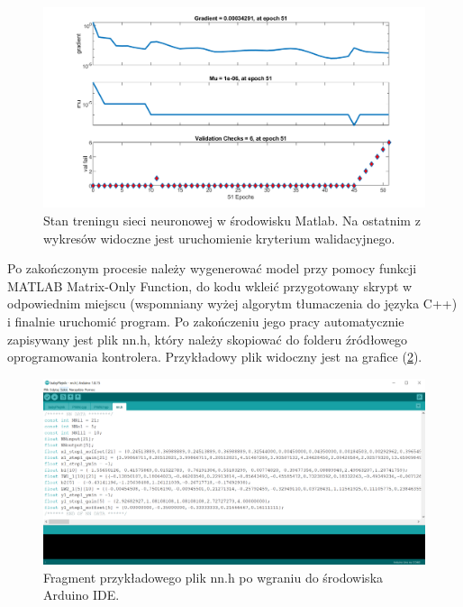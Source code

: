 \documentclass[12pt, a4paper]{article}
\let\oldref\ref
\renewcommand{\ref}[1]{(\oldref{#1})}
\begin{document}
 \begin{figure}[ht]
    \centering
    \includegraphics[width=1\textwidth]{training_state}
    \caption{Stan treningu sieci neuronowej w środowisku Matlab. Na ostatnim z wykresów widoczne jest uruchomienie kryterium walidacyjnego.}
    \label{fig:matwyk}
\end{figure}

Po zakończonym procesie należy wygenerować model przy pomocy funkcji MATLAB Matrix-Only Function, do kodu wkleić przygotowany skrypt w odpowiednim miejscu (wspomniany wyżej algorytm tłumaczenia do języka C++) i finalnie uruchomić program. Po zakończeniu jego pracy automatycznie zapisywany jest plik nn.h, który należy skopiować do folderu źródłowego oprogramowania kontrolera. Przykładowy plik widoczny jest na grafice \ref{fig:nn}.

 \begin{figure}[ht]
    \centering
    \includegraphics[width=1\textwidth]{nnh}
    \caption{Fragment przykładowego plik nn.h po wgraniu do środowiska Arduino IDE.}
    \label{fig:nn}
\end{figure}

\FloatBarrier
\end{document}
